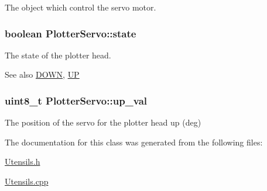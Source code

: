 The object which control the servo motor. 

\hypertarget{class_plotter_servo_a3309473d867ae37982f1ff0caba0c86b}{
\subsubsection[{state}]{\setlength{\rightskip}{0pt plus 5cm}boolean Plotter\+Servo\+::state\hspace{0.3cm}{\ttfamily [private]}}}\label{class_plotter_servo_a3309473d867ae37982f1ff0caba0c86b}


The state of the plotter head. 

\begin{DoxySeeAlso}{See also}
\hyperlink{_utensils_8h_a4193cd1c8c2e6ebd0e056fa2364a663f}{D\+O\+W\+N}, \hyperlink{_utensils_8h_a1965eaca47dbf3f87acdafc2208f04eb}{U\+P} 
\end{DoxySeeAlso}
\hypertarget{class_plotter_servo_ac5a8cf60736715222a53a774c4e077f7}{
\subsubsection[{up\+\_\+val}]{\setlength{\rightskip}{0pt plus 5cm}uint8\+\_\+t Plotter\+Servo\+::up\+\_\+val\hspace{0.3cm}{\ttfamily [private]}}}\label{class_plotter_servo_ac5a8cf60736715222a53a774c4e077f7}


The position of the servo for the plotter head up (deg) 



The documentation for this class was generated from the following files\+:\begin{DoxyCompactItemize}
\item 
\hyperlink{_utensils_8h}{Utensils.\+h}\item 
\hyperlink{_utensils_8cpp}{Utensils.\+cpp}\end{DoxyCompactItemize}
